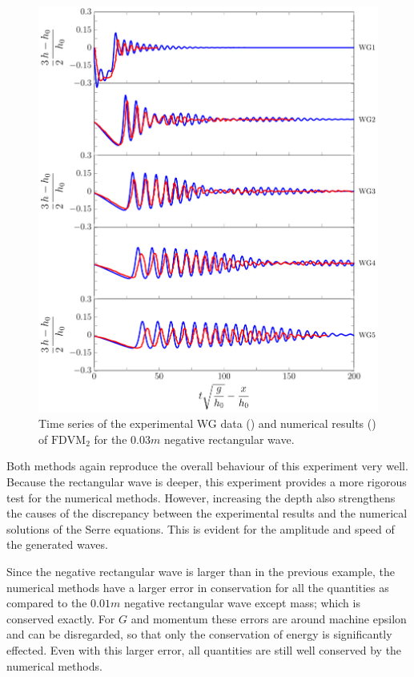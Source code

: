 \begin{figure}
	\centering
	\includegraphics[width=\textwidth]{./chp6/figures/Experiment/Segur/LongWGsFDVM3cm.pdf}
	\caption{Time series of the experimental WG data ({\color{red}\solidrule}) and numerical results ({\color{blue}\solidrule}) of $\text{FDVM}_2$ for the $0.03m$ negative rectangular wave.}
	\label{fig:Segur3cmFDVM}
\end{figure} 

Both methods again reproduce the overall behaviour of this experiment very well. Because the rectangular wave is deeper, this experiment provides a more rigorous test for the numerical methods. However, increasing the depth also strengthens the causes of the discrepancy between the experimental results and the numerical solutions of the Serre equations. This is evident for the amplitude and speed of the generated waves.

Since the negative rectangular wave is larger than in the previous example, the numerical methods have a larger error in conservation for all the quantities as compared to the $0.01m$ negative rectangular wave except mass; which is conserved exactly. For $G$ and momentum these errors are around machine epsilon and can be disregarded, so that only the conservation of energy is significantly effected. Even with this larger error, all quantities are still well conserved by the numerical methods. 


